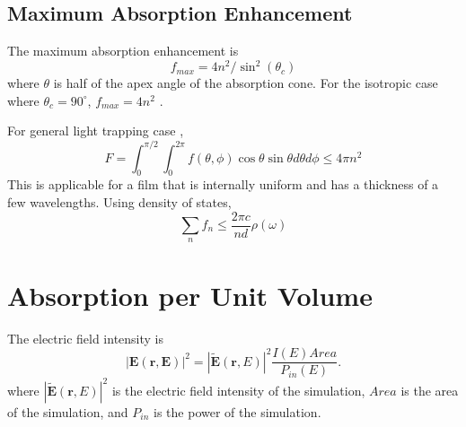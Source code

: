 \documentclass[12pt]{article}
\begin{document}
\subsection{Maximum Absorption Enhancement}
The maximum absorption enhancement is 
\begin{equation}
f_{max} = 4 n^2/ \sin^2(\theta_c)
\end{equation}
where $\theta$ is half of the apex angle of the absorption cone.  
For the isotropic case where $\theta_c = 90^{\circ}$, $f_{max} = 4 n^2$ \cite{Yablonovitch:82july}.  

For general light trapping case \cite{Yu:11},
\begin{equation}
F = \int_0^{\pi/2} \int_{0}^{2 \pi} f(\theta, \phi) \cos \theta \sin \theta d \theta d \phi \leq 4 \pi n^2
\end{equation}
This is applicable for a film that is internally uniform and has a thickness of a few wavelengths.  
Using density of states, 
\begin{equation}
\sum_n f_n \leq \frac{2 \pi c}{n d} \rho (\omega)
\end{equation}


%
%
%
%
%



\section{Absorption per Unit Volume}

The electric field intensity is 
\begin{equation}
| \mathbf{E}(\mathbf{r, E}) |^2 = | \tilde{\mathbf{E}}(\mathbf{r}, E) |^2 \frac{I(E) Area }{P_{in}(E)}.
\end{equation}
where $| \tilde{\mathbf{E}}(\mathbf{r}, E) |^2$ is the electric field intensity of the simulation, $Area$ is the area of the simulation, and $P_{in}$ is the power of the simulation.
\end{document}
